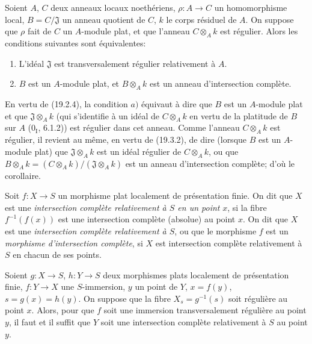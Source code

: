 \begin{corollary}[19.3.5]
\label{IV.19.3.5}
Soient $A$, $C$ deux anneaux locaux noethériens, $\rho:A\to C$ un homomorphisme local, $B=C/\mathfrak J$ un anneau quotient de $C$, $k$ le corps résiduel de $A$. On suppose que $\rho$ fait de $C$ un $A$-module plat, et que l'anneau $C\otimes_A k$ est régulier. Alors les conditions suivantes sont équivalentes:
\begin{enumerate}
  \item[a)] L'idéal $\mathfrak J$ est transversalement régulier relativement à $A$.
  \item[b)] $B$ est un $A$-module plat, et $B\otimes_A k$ est un anneau d'intersection complète.
\end{enumerate}
\end{corollary}


En vertu de (19.2.4), la condition $a)$ équivaut à dire que $B$ est un $A$-module plat et que $\mathfrak J\otimes_A k$ (qui s'identifie à un idéal de $C\otimes_A k$ en vertu de la platitude de $B$ sur $A$ ($0_{\mathrm I}$, 6.1.2)) est régulier dans cet anneau. Comme l'anneau $C\otimes_A k$ est régulier, il revient au même, en vertu de (19.3.2), de dire (lorsque $B$ est un $A$-module plat) que $\mathfrak J\otimes_A k$ est un idéal régulier de $C\otimes_A k$, ou que $B\otimes_A k=(C\otimes_A k)/(\mathfrak J\otimes_A k)$ est un anneau d'intersection complète; d'où le corollaire.

\begin{definition}[19.3.6]
Soit $f:X\to S$ un morphisme plat localement de présentation finie. On dit que $X$ est une \emph{intersection complète relativement à $S$ en un point} $x$, si la fibre $f^{-1}(f(x))$ est une intersection complète (absolue) au point $x$. On dit que $X$ est une \emph{intersection complète relativement à $S$}, ou que le morphisme $f$ est un \emph{morphisme d'intersection complète}, si $X$ est intersection complète relativement à $S$ en chacun de ses points.
\end{definition}

\begin{proposition}[19.3.7]
\label{IV.19.3.7}
Soient $g:X\to S$, $h:Y\to S$ deux morphismes plats localement de présentation finie, $f:Y\to X$ une $S$-immersion, $y$ un point de $Y$, $x=f(y)$, $s=g(x)=h(y)$. On suppose que la fibre $X_s=g^{-1}(s)$ soit régulière au point $x$. Alors, pour que $f$ soit une immersion transversalement régulière au point $y$, il faut et il suffit que $Y$ soit une intersection complète relativement à $S$ au point $y$.
\end{proposition}

